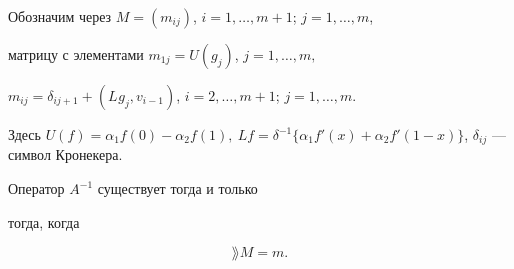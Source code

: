 Обозначим через $M=(m_{ij})$, $i=1,\dotsc,m+1$; $j=1,\dotsc,m$,


матрицу с элементами $m_{1j}=U(g_j)$, $j=1,\dotsc,m,$


$m_{ij}=\delta_{ij+1}+(L_{}g_j,v_{i-1})$, $i=2,\dotsc,m+1$; $j=1,\dotsc,m.$


Здесь $U(f)=\alpha_1f(0)-\alpha_2f(1),\ Lf=\delta^{-1}\{\alpha_1f'(x)+


\alpha_2f'(1-x)\}$, $\delta_{ij}$ ---  символ Кронекера.





\begin{thm}


Оператор $A^{-1}$ существует тогда и только


тогда, когда


$$


\rang M=m.


$$


\end{thm}





